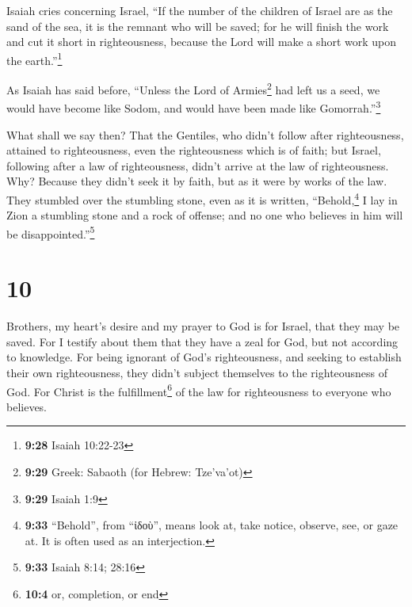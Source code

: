  Isaiah cries concerning Israel, ``If the number of the
children of Israel are as the sand of the sea, it is the remnant who
will be saved;  for he will finish the work and cut it
short in righteousness, because the Lord will make a short work upon the
earth.''\footnote{\textbf{9:28} Isaiah 10:22-23}

 As Isaiah has said before, ``Unless the Lord of
Armies\footnote{\textbf{9:29} Greek: Sabaoth (for Hebrew: Tze'va'ot)}
had left us a seed, we would have become like Sodom, and would have been
made like Gomorrah.''\footnote{\textbf{9:29} Isaiah 1:9}

 What shall we say then? That the Gentiles, who didn't
follow after righteousness, attained to righteousness, even the
righteousness which is of faith;  but Israel, following
after a law of righteousness, didn't arrive at the law of righteousness.
 Why? Because they didn't seek it by faith, but as it
were by works of the law. They stumbled over the stumbling stone,
 even as it is written, ``Behold,\footnote{\textbf{9:33}
  ``Behold'', from ``ἰδοὺ'', means look at, take notice, observe, see,
  or gaze at. It is often used as an interjection.} I lay in Zion a
stumbling stone and a rock of offense; and no one who believes in him
will be disappointed.''\footnote{\textbf{9:33} Isaiah 8:14; 28:16}

\hypertarget{section-9}{%
\section{10}\label{section-9}}

 Brothers, my heart's desire and my prayer to God is for
Israel, that they may be saved.  For I testify about them
that they have a zeal for God, but not according to knowledge.
 For being ignorant of God's righteousness, and seeking to
establish their own righteousness, they didn't subject themselves to the
righteousness of God.  For Christ is the
fulfillment\footnote{\textbf{10:4} or, completion, or end} of the law
for righteousness to everyone who believes.

